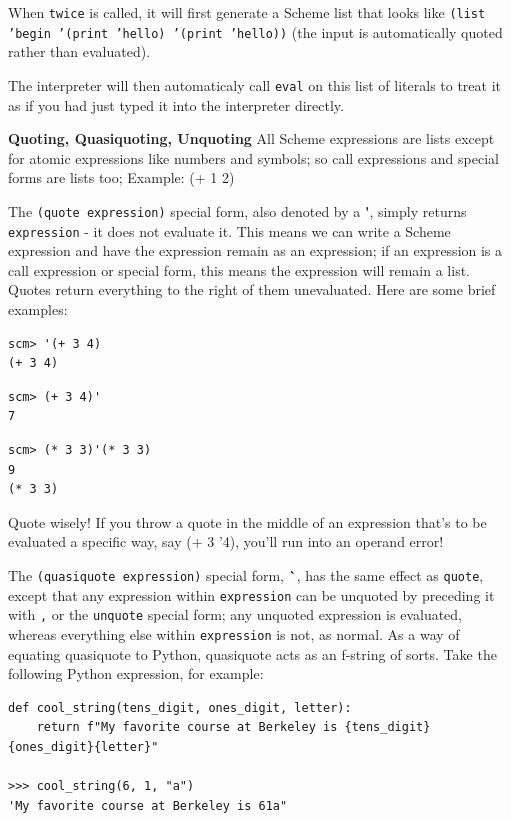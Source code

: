 When \texttt{twice} is called, it will first generate a Scheme list that looks like \texttt{(list 'begin '(print 'hello) '(print 'hello))} (the input is automatically quoted rather than evaluated).

The interpreter will then automaticaly call \texttt{eval} on this list of literals to treat it as if you had just typed it into the interpreter directly. 

\newpage
\textbf{Quoting, Quasiquoting, Unquoting} All Scheme expressions are lists except for atomic expressions like numbers and symbols; so call expressions and special forms are lists too; Example: (+ 1 2)

The \texttt{(quote expression)} special form, also denoted by a \textbf{\'}, simply returns \texttt{expression} - it does not evaluate it. 
This means we can write a Scheme expression and have the expression remain as an expression; if an expression is a call expression or special form, this means the expression will remain a list. 
Quotes return everything to the right of them unevaluated. Here are some brief examples:

\begin{lstlisting}
scm> '(+ 3 4)
(+ 3 4)
\end{lstlisting}
\begin{lstlisting}
scm> (+ 3 4)'
7
\end{lstlisting}
\begin{lstlisting}
scm> (* 3 3)'(* 3 3)
9
(* 3 3)
\end{lstlisting}
Quote wisely! If you throw a quote in the middle of an expression that's to be evaluated a specific way, say (+ 3 '4), you'll run into an operand error!

The \texttt{(quasiquote expression)} special form, \textbf{\`}, has the same effect as \texttt{quote}, except that any expression within \texttt{expression} can be unquoted by preceding it with \texttt{,} or the \texttt{unquote} special form; any unquoted expression is evaluated, whereas everything else within \texttt{expression} is not, as normal. 
As a way of equating quasiquote to Python, quasiquote acts as an f-string of sorts. Take the following Python expression, for example:

\begin{lstlisting}
def cool_string(tens_digit, ones_digit, letter):
    return f"My favorite course at Berkeley is {tens_digit}{ones_digit}{letter}"

>>> cool_string(6, 1, "a")
'My favorite course at Berkeley is 61a"
\end{lstlisting}

